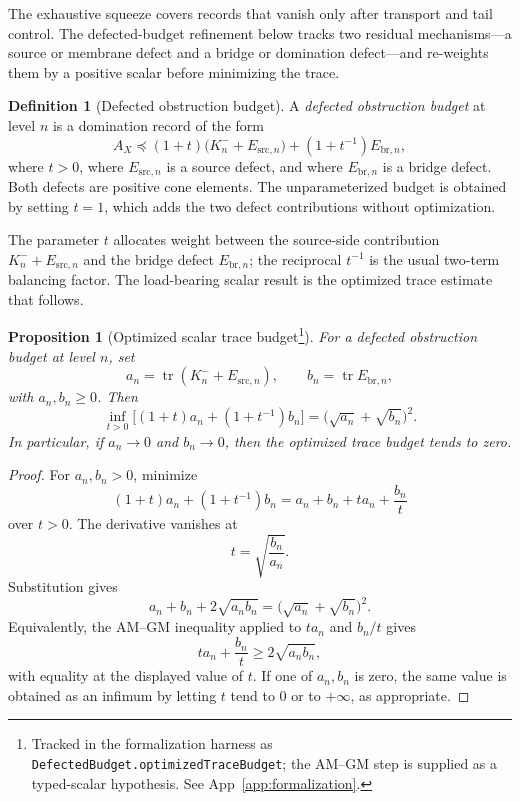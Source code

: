 \documentclass[11pt]{article}
\DeclareMathOperator{\trace}{tr}
\newcommand{\AX}{A_{X}}
\newcommand{\Kminus}{K^{-}}
\newtheorem{proposition}[theorem]{Proposition}
\theoremstyle{definition}
\newtheorem{definition}[theorem]{Definition}
\begin{document}
The exhaustive squeeze covers records that vanish only after
transport and tail control.  The defected-budget refinement below
tracks two residual mechanisms---a source or membrane defect and a
bridge or domination defect---and re-weights them by a positive
scalar before minimizing the trace.

\begin{definition}[Defected obstruction budget]
\label{def:duality_confinement:defected-budget}
A \emph{defected obstruction budget} at level \(n\) is a domination
record of the form
\[
  \AX
  \preceq
  (1+t)\bigl(\Kminus_{n}+E_{\mathrm{src},n}\bigr)
  +(1+t^{-1})E_{\mathrm{br},n},
\]
where \(t>0\), where \(E_{\mathrm{src},n}\) is a source defect, and
where \(E_{\mathrm{br},n}\) is a bridge defect.  Both defects are
positive cone elements.  The unparameterized budget is obtained by
setting \(t=1\), which adds the two defect contributions without
optimization.
\end{definition}

The parameter \(t\) allocates weight between the source-side
contribution \(\Kminus_{n}+E_{\mathrm{src},n}\) and the bridge
defect \(E_{\mathrm{br},n}\); the reciprocal \(t^{-1}\) is the usual
two-term balancing factor.  The load-bearing scalar result is the
optimized trace estimate that follows.

\begin{proposition}[Optimized scalar trace budget\protect\footnote{Tracked in the formalization harness as \nolinkurl{DefectedBudget.optimizedTraceBudget}; the AM--GM step is supplied as a typed-scalar hypothesis. See App~\ref{app:formalization}.}]
\label{prop:duality_confinement:optimized-trace-budget}
For a defected obstruction budget at level \(n\), set
\[
  a_n=\trace(\Kminus_{n}+E_{\mathrm{src},n}),
  \qquad
  b_n=\trace E_{\mathrm{br},n},
\]
with \(a_n,b_n\geq0\).  Then
\[
  \inf_{t>0}
  \bigl[(1+t)a_n+(1+t^{-1})b_n\bigr]
  =
  \bigl(\sqrt{a_n}+\sqrt{b_n}\bigr)^2.
\]
In particular, if \(a_n\to0\) and \(b_n\to0\), then the optimized
trace budget tends to zero.
\end{proposition}

\begin{proof}
For \(a_n,b_n>0\), minimize
\[
  (1+t)a_n+(1+t^{-1})b_n
  =
  a_n+b_n+t a_n+\frac{b_n}{t}
\]
over \(t>0\).  The derivative vanishes at
\[
  t=\sqrt{\frac{b_n}{a_n}}.
\]
Substitution gives
\[
  a_n+b_n+2\sqrt{a_n b_n}
  =
  \bigl(\sqrt{a_n}+\sqrt{b_n}\bigr)^2.
\]
Equivalently, the AM--GM inequality
\citep{HardyLittlewoodPolya1952} applied to \(t a_n\) and
\(b_n/t\) gives
\[
  t a_n+\frac{b_n}{t}\geq2\sqrt{a_n b_n},
\]
with equality at the displayed value of \(t\).  If one of
\(a_n,b_n\) is zero, the same value is obtained as an infimum by
letting \(t\) tend to \(0\) or to \(+\infty\), as appropriate.
\end{proof}
\end{document}
